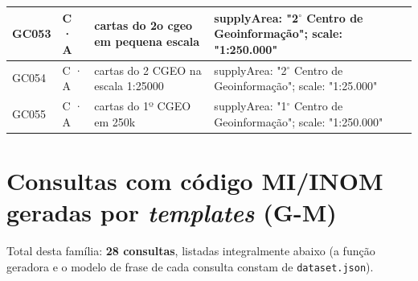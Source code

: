 {\begin{longtable}{|p{1.1cm}|p{1.3cm}|p{5.4cm}|p{6.3cm}|}
GC053 & C · A & cartas do 2o cgeo em pequena escala & supplyArea: "2$^\circ$ Centro de Geoinformação"; scale: "1:250.000" \\ \hline
GC054 & C · A & cartas do 2 CGEO na escala 1:25000 & supplyArea: "2$^\circ$ Centro de Geoinformação"; scale: "1:25.000" \\ \hline
GC055 & C · A & cartas do 1º CGEO em 250k & supplyArea: "1$^\circ$ Centro de Geoinformação"; scale: "1:250.000" \\ \hline
\end{longtable}
\addtocounter{table}{-1}
}

\section{Consultas com c\'odigo MI/INOM geradas por \textit{templates} \texorpdfstring{\mbox{(G-M)}}{(G-M)}}

Total desta fam\'ilia: \textbf{28 consultas}, listadas integralmente abaixo (a fun\c{c}\~ao geradora e o modelo de frase de cada consulta constam de \texttt{dataset.json}).

